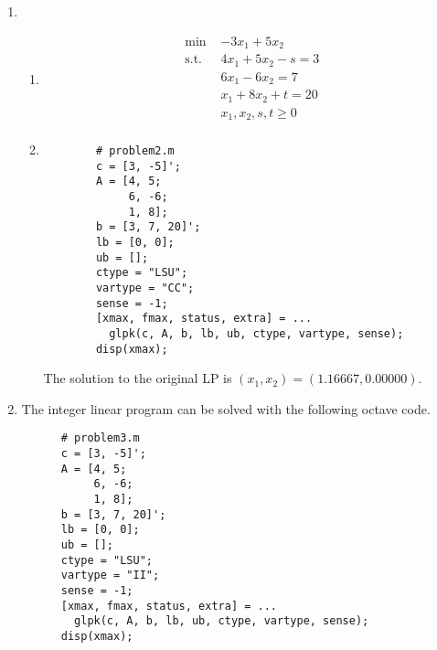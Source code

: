 \documentclass[12pt]{article}
\begin{document}
\begin{enumerate}
\begin{enumerate}
\begin{center}
        \end{center}
    \end{enumerate}
  \item
    \begin{enumerate}
      \item
        \begin{equation}
          \begin{split}
            \text{min }& -3x_1 + 5x_2 \\
            \text{s.t. }& 4x_1 + 5x_2 - s = 3 \\
            & 6x_1 - 6x_2 = 7 \\
            & x_1 + 8x_2 + t = 20 \\
            & x_1, x_2, s, t\geq 0 \\
          \end{split}
        \end{equation}
      \item
        \begin{lstlisting}
        # problem2.m
        c = [3, -5]';
        A = [4, 5;
             6, -6;
             1, 8];
        b = [3, 7, 20]';
        lb = [0, 0];
        ub = [];
        ctype = "LSU";
        vartype = "CC";
        sense = -1;
        [xmax, fmax, status, extra] = ...
          glpk(c, A, b, lb, ub, ctype, vartype, sense);
        disp(xmax);
        \end{lstlisting}

        The solution to the original LP is $(x_1, x_2) = (1.16667, 0.00000)$.\\
    \end{enumerate}
  \item
    The integer linear program can be solved with the following octave code.\\
    \begin{lstlisting}
      # problem3.m
      c = [3, -5]';
      A = [4, 5;
           6, -6;
           1, 8];
      b = [3, 7, 20]';
      lb = [0, 0];
      ub = [];
      ctype = "LSU";
      vartype = "II";
      sense = -1;
      [xmax, fmax, status, extra] = ...
        glpk(c, A, b, lb, ub, ctype, vartype, sense);
      disp(xmax);
    \end{lstlisting}


\end{enumerate}
\end{document}
